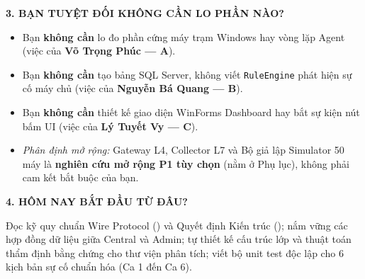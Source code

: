 \documentclass[12pt,a4paper]{article}
\begin{document}
\begin{tcolorbox}[enhanced, colback=lgLightRed, colframe=lgCrimson, boxrule=0.8pt, arc=1.5mm, top=1.8mm, bottom=1.8mm, left=2.5mm, right=2.5mm]
{\bfseries\color{lgCrimson} 3. BẠN TUYỆT ĐỐI KHÔNG CẦN LO PHẦN NÀO?}\par
\vspace{0.5mm}
\begin{itemize}[leftmargin=1.5em, itemsep=0.5pt, parsep=0pt, topsep=1pt]
  \item Bạn \textbf{không cần} lo đo phần cứng máy trạm Windows hay vòng lặp Agent (việc của \textbf{Võ Trọng Phúc --- A}).
  \item Bạn \textbf{không cần} tạo bảng SQL Server, không viết \texttt{RuleEngine} phát hiện sự cố máy chủ (việc của \textbf{Nguyễn Bá Quang --- B}).
  \item Bạn \textbf{không cần} thiết kế giao diện WinForms Dashboard hay bắt sự kiện nút bấm UI (việc của \textbf{Lý Tuyết Vy --- C}).
  \item \textit{Phân định mở rộng:} Gateway L4, Collector L7 và Bộ giả lập Simulator 50 máy là \textbf{nghiên cứu mở rộng P1 tùy chọn} (nằm ở Phụ lục), không phải cam kết bắt buộc của bạn.
\end{itemize}
\end{tcolorbox}
\vspace{1.5mm}

\begin{tcolorbox}[enhanced, colback=lgLightGreen, colframe=lgForestGreen, boxrule=0.8pt, arc=1.5mm, top=1.8mm, bottom=1.8mm, left=2.5mm, right=2.5mm]
{\bfseries\color{lgForestGreen} 4. HÔM NAY BẮT ĐẦU TỪ ĐÂU?}\par
\vspace{0.5mm}
Đọc kỹ quy chuẩn Wire Protocol () và Quyết định Kiến trúc (); nắm vững các hợp đồng dữ liệu giữa Central và Admin; tự thiết kế cấu trúc lớp và thuật toán thẩm định bằng chứng cho thư viện phân tích; viết bộ unit test độc lập cho 6 kịch bản sự cố chuẩn hóa (Ca 1 đến Ca 6).
\end{tcolorbox}
\vspace{1.5mm}
\end{document}
